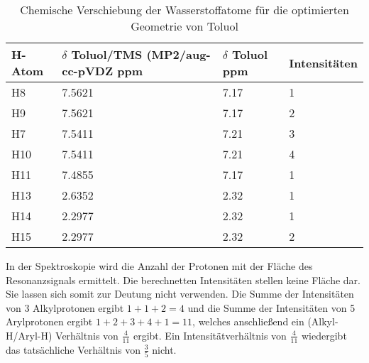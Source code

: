 \documentclass[12pt]{article}
\begin{document}
\begin{onehalfspace}
\begin{table}[!htpb]
\centering
\caption{Chemische Verschiebung der Wasserstoffatome für die optimierten Geometrie von Toluol}
\begin{tabular}{llll}
\toprule
H-Atom  & \parbox[t]{4cm}{$\delta$ Toluol/TMS \\ (MP2/aug-cc-pVDZ\\ ppm}  &  \parbox[t]{4cm}{$\delta$ Toluol\cite{zeeh} ppm} & Intensitäten\\
\midrule
H8 &   7.5621 & 7.17 & 1  \\
H9 &   7.5621 & 7.17 & 2  \\
H7 &   7.5411 & 7.21 & 3  \\
H10 & 7.5411 & 7.21 & 4 \\
H11 & 7.4855 & 7.17 & 1 \\
H13 & 2.6352 & 2.32 & 1 \\
H14 & 2.2977 & 2.32 & 1 \\
H15 & 2.2977 & 2.32 & 2 \\
\bottomrule
\end{tabular}
\end{table}
\noindent
In der  Spektroskopie wird die Anzahl der Protonen
 mit der Fläche des Resonanzsignals ermittelt.
 Die berechnetten Intensitäten stellen keine Fläche dar.
 Sie lassen sich somit zur Deutung nicht verwenden.
 Die Summe der Intensitäten von 3 Alkylprotonen ergibt $1 + 1 + 2 = 4$
 und die Summe der Intensitäten von 5 Arylprotonen ergibt $1+2+3+4+1 = 11 $,
 welches anschließend ein (Alkyl-H/Aryl-H) Verhältnis von $\frac{4}{11}$ ergibt.
  Ein Intensitätverhältnis von $\frac{4}{11}$ wiedergibt das tatsächliche Verhältnis von $\frac{3}{5}$ nicht.




\end{onehalfspace}
\end{document}
